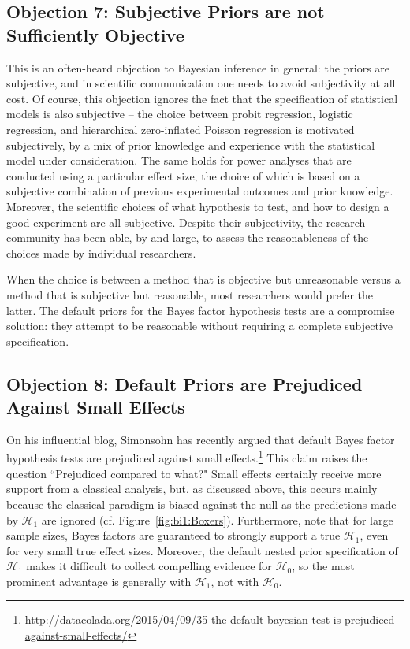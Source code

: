 \subsection{Objection 7: Subjective Priors are not Sufficiently Objective}
This is an often-heard objection to Bayesian inference in general: the priors are subjective, and in scientific communication one needs to avoid subjectivity at all cost. Of course, this objection ignores the fact that the specification of statistical models is also subjective -- the choice between probit regression, logistic regression, and hierarchical zero-inflated Poisson regression is motivated subjectively, by a mix of prior knowledge and experience with the statistical model under consideration. The same holds for power analyses that are conducted using a particular effect size, the choice of which is based on a subjective combination of previous experimental outcomes and prior knowledge. Moreover, the scientific choices of what hypothesis to test, and how to design a good experiment are all subjective. Despite their subjectivity, the research community has been able, by and large, to assess the reasonableness of the choices made by individual researchers.

When the choice is between a method that is objective but unreasonable versus a method that is subjective but reasonable, most researchers would prefer the latter. The default priors for the Bayes factor hypothesis tests are a compromise solution: they attempt to be reasonable without requiring a complete subjective specification.

\subsection{Objection 8: Default Priors are Prejudiced Against Small Effects}
On his influential blog, Simonsohn has recently argued that default Bayes factor hypothesis tests are prejudiced against small effects.\footnote{\url{http://datacolada.org/2015/04/09/35-the-default-bayesian-test-is-prejudiced-against-small-effects/}} This claim raises the question ``Prejudiced compared to what?" Small effects certainly receive more support from a classical analysis, but, as discussed above, this occurs mainly because the classical paradigm is biased against the null as the predictions made by $\mathcal{H}_1$ are ignored (cf. Figure~\ref{fig:bi1:Boxers}). Furthermore, note that for large sample sizes, Bayes factors are guaranteed to strongly support a true $\mathcal{H}_1$, even for very small true effect sizes. Moreover, the default nested prior specification of $\mathcal{H}_1$ makes it difficult to collect compelling evidence for $\mathcal{H}_0$, so the most prominent advantage is generally with $\mathcal{H}_1$, not with $\mathcal{H}_0$.

